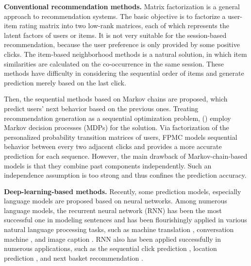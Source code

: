 \documentclass[letterpaper]{article} \usepackage{cite}
\begin{document}
{\bf Conventional recommendation methods.}
Matrix factorization \cite{mnih2007probabilistic,koren2009matrix,koren2011advances} is a general approach to recommendation systems. The basic objective is to factorize a user-item rating matrix into two low-rank matrices, each of which represents the latent factors of users or items. It is not very suitable for the session-based recommendation, because the user preference is only provided by some positive clicks. The item-based neighborhood methods \cite{Sarwar2001} is a natural solution, in which item similarities are calculated on the co-occurrence in the same session. These methods have difficulty in considering the sequential order of items and generate prediction merely based on the last click.

Then, the sequential methods based on Markov chains are proposed, which predict users' next behavior based on the previous ones. Treating recommendation generation as a sequential optimization problem, \citeauthor{Shani:2002:MRS:2073876.2073930} (\citeyear{Shani:2002:MRS:2073876.2073930}) employ Markov decision processes (MDPs) for the solution. Via factorization of the personalized probability transition matrices of users, FPMC \cite{rendle2010factorizing} models sequential behavior between every two adjacent clicks and provides a more accurate prediction for each sequence. However, the main drawback of Markov-chain-based models is that they combine past components independently. Such an independence assumption is too strong and thus confines the prediction accuracy.

{\bf Deep-learning-based methods.}
Recently, some prediction models, especially language models \cite{mikolov2013distributed} are proposed based on neural networks. Among numerous language models, the recurrent neural network (RNN) has been the most successful one in modeling sentences \cite{mikolov2010recurrent} and has been flourishingly applied in various natural language processing tasks, such as machine translation \cite{cho2014learning}, conversation machine \cite{serban2016building}, and image caption \cite{mao2014deep}. RNN also has been applied successfully in numerous applications, such as the sequential click prediction \cite{zhang2014sequential}, location prediction \cite{liu2016strnn}, and next basket recommendation \cite{yu2016dream}.
\end{document}
